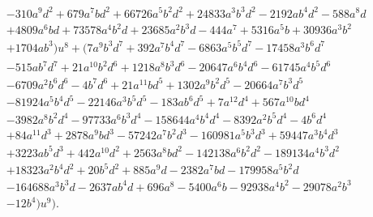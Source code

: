 \documentclass{gtpart}
\theoremstyle{definition}
\theoremstyle{remark}
\begin{document}
\begin{equation*}
\begin{split}
      & - 310 a^9 d^2 + 679 a^7 b d^2 + 66726 a^5 b^2 d^2 + 24833 a^3 b^3 d^2 - 2192 a b^4 d^2 - 588 a^8 d \\
      & + 4809 a^6 b d + 73578 a^4 b^2 d + 23685 a^2 b^3 d - 444 a^7 + 5316 a^5 b + 30936 a^3 b^2 \\
      & + 1704 a b^3) u^8 + (7 a^9 b^3 d^7 + 392 a^7 b^4 d^7 - 6863 a^5 b^5 d^7 - 17458 a^3 b^6 d^7 \\
      & - 515 a b^7 d^7 + 21 a^{10} b^2 d^6 + 1218 a^8 b^3 d^6 - 20647 a^6 b^4 d^6 - 61745 a^4 b^5 d^6 \\
      & - 6709 a^2 b^6 d^6 - 4 b^7 d^6 + 21 a^{11} b d^5 + 1302 a^9 b^2 d^5 - 20664 a^7 b^3 d^5 \\
      & - 81924 a^5 b^4 d^5 - 22146 a^3 b^5 d^5 - 183 a b^6 d^5 + 7 a^{12} d^4 + 567 a^{10} b d^4 \\
      & - 3982 a^8 b^2 d^4 - 97733 a^6 b^3 d^4 - 158644 a^4 b^4 d^4 - 8392 a^2 b^5 d^4 - 4 b^6 d^4 \\
      & + 84 a^{11} d^3 + 2878 a^9 b d^3 - 57242 a^7 b^2 d^3 - 160981 a^5 b^3 d^3 + 59447 a^3 b^4 d^3 \\
      & + 3223 a b^5 d^3 + 442 a^{10} d^2 + 2563 a^8 b d^2 - 142138 a^6 b^2 d^2 - 189134 a^4 b^3 d^2 \\
      & + 18323 a^2 b^4 d^2 + 20 b^5 d^2 + 885 a^9 d - 2382 a^7 b d - 179958 a^5 b^2 d \\
      & - 164688 a^3 b^3 d - 2637 a b^4 d + 696 a^8 - 5400 a^6 b - 92938 a^4 b^2 - 29078 a^2 b^3 \\
      & - 12 b^4) u^9 \big).  
\end{split}
\end{equation*}


%
%
\end{document}
